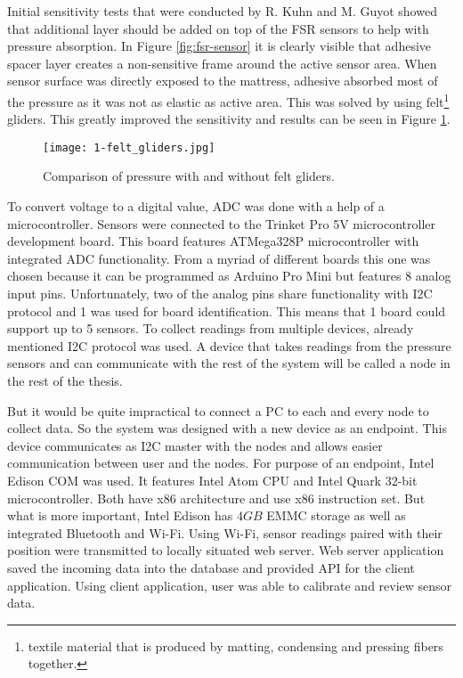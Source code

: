 Initial sensitivity tests that were conducted by R. Kuhn and M. Guyot showed that additional layer should be added on top of the \ac{FSR} sensors to help with pressure absorption. In Figure \ref{fig:fsr-sensor} it is clearly visible that adhesive spacer layer creates a non-sensitive frame around the active sensor area. When sensor surface was directly exposed to the mattress, adhesive absorbed most of the pressure as it was not as elastic as active area. This was solved by using felt\footnote{textile material that is produced by matting, condensing and pressing fibers together.} gliders. This greatly improved the sensitivity and results can be seen in Figure \ref{fig:felt_gliders}.

\begin{figure}[h]
  \begin{center}
    \texttt{[image: 1-felt\_gliders.jpg]}
  \end{center}
  \caption{Comparison of pressure with and without felt gliders.}
  \label{fig:felt_gliders}
\end{figure}

To convert voltage to a digital value, \ac{ADC} was done with a help of a microcontroller. Sensors were connected to the Trinket Pro 5V microcontroller development board\cite{Trinket}. This board features ATMega328P microcontroller with integrated \ac{ADC} functionality\cite{atmega328p}. From a myriad of different boards this one was chosen because it can be programmed as Arduino Pro Mini but features 8 analog input pins. Unfortunately, two of the analog pins share functionality with \ac{I2C} protocol and 1 was used for board identification. This means that 1 board could support up to 5 sensors. To collect readings from multiple devices, already mentioned \ac{I2C} protocol was used. A device that takes readings from the pressure sensors and can communicate with the rest of the system will be called a node in the rest of the thesis.

But it would be quite impractical to connect a \ac{PC} to each and every node to collect data. So the system was designed with a new device as an endpoint. This device communicates as \ac{I2C} master with the nodes and allows easier communication between user and the nodes. For purpose of an endpoint, Intel Edison \ac{COM} was used. It features Intel Atom \ac{CPU} and Intel Quark 32-bit microcontroller\cite{Edison}. Both have x86 architecture and use x86 instruction set. But what is more important, Intel Edison has $4GB$ \ac{EMMC} storage as well as integrated Bluetooth and Wi-Fi. Using Wi-Fi, sensor readings paired with their position were transmitted to locally situated web server. Web server application saved the incoming data into the database and provided \ac{API} for the client application. Using client application, user was able to calibrate and review sensor data.


